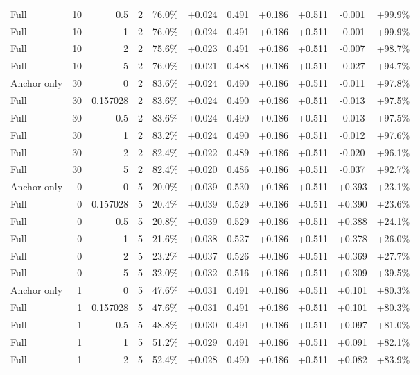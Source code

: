 \begin{table}[htbp]
\begin{tabular}{lrrrccccccc}
Full & 10 & 0.5 & 2 & 76.0\% & +0.024 & 0.491 & +0.186 & +0.511 & -0.001 & +99.9\% \\
Full & 10 & 1 & 2 & 76.0\% & +0.024 & 0.491 & +0.186 & +0.511 & -0.001 & +99.9\% \\
Full & 10 & 2 & 2 & 75.6\% & +0.023 & 0.491 & +0.186 & +0.511 & -0.007 & +98.7\% \\
Full & 10 & 5 & 2 & 76.0\% & +0.021 & 0.488 & +0.186 & +0.511 & -0.027 & +94.7\% \\
Anchor only & 30 & 0 & 2 & 83.6\% & +0.024 & 0.490 & +0.186 & +0.511 & -0.011 & +97.8\% \\
Full & 30 & 0.157028 & 2 & 83.6\% & +0.024 & 0.490 & +0.186 & +0.511 & -0.013 & +97.5\% \\
Full & 30 & 0.5 & 2 & 83.6\% & +0.024 & 0.490 & +0.186 & +0.511 & -0.013 & +97.5\% \\
Full & 30 & 1 & 2 & 83.2\% & +0.024 & 0.490 & +0.186 & +0.511 & -0.012 & +97.6\% \\
Full & 30 & 2 & 2 & 82.4\% & +0.022 & 0.489 & +0.186 & +0.511 & -0.020 & +96.1\% \\
Full & 30 & 5 & 2 & 82.4\% & +0.020 & 0.486 & +0.186 & +0.511 & -0.037 & +92.7\% \\
Anchor only & 0 & 0 & 5 & 20.0\% & +0.039 & 0.530 & +0.186 & +0.511 & +0.393 & +23.1\% \\
Full & 0 & 0.157028 & 5 & 20.4\% & +0.039 & 0.529 & +0.186 & +0.511 & +0.390 & +23.6\% \\
Full & 0 & 0.5 & 5 & 20.8\% & +0.039 & 0.529 & +0.186 & +0.511 & +0.388 & +24.1\% \\
Full & 0 & 1 & 5 & 21.6\% & +0.038 & 0.527 & +0.186 & +0.511 & +0.378 & +26.0\% \\
Full & 0 & 2 & 5 & 23.2\% & +0.037 & 0.526 & +0.186 & +0.511 & +0.369 & +27.7\% \\
Full & 0 & 5 & 5 & 32.0\% & +0.032 & 0.516 & +0.186 & +0.511 & +0.309 & +39.5\% \\
Anchor only & 1 & 0 & 5 & 47.6\% & +0.031 & 0.491 & +0.186 & +0.511 & +0.101 & +80.3\% \\
Full & 1 & 0.157028 & 5 & 47.6\% & +0.031 & 0.491 & +0.186 & +0.511 & +0.101 & +80.3\% \\
Full & 1 & 0.5 & 5 & 48.8\% & +0.030 & 0.491 & +0.186 & +0.511 & +0.097 & +81.0\% \\
Full & 1 & 1 & 5 & 51.2\% & +0.029 & 0.491 & +0.186 & +0.511 & +0.091 & +82.1\% \\
Full & 1 & 2 & 5 & 52.4\% & +0.028 & 0.490 & +0.186 & +0.511 & +0.082 & +83.9\% \\

\end{tabular}
\end{table}
